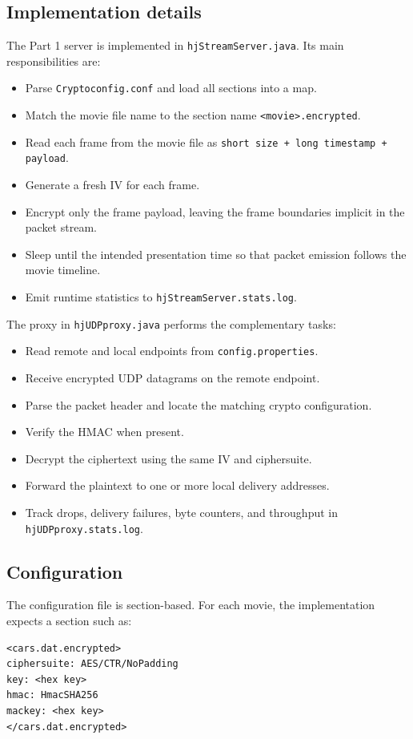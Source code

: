 \documentclass[11pt,a4paper]{article}
\begin{document}
\subsection{Implementation details}
The Part 1 server is implemented in \texttt{hjStreamServer.java}. Its main responsibilities are:
\begin{itemize}[leftmargin=1.2em]
  \item Parse \texttt{Cryptoconfig.conf} and load all sections into a map.
  \item Match the movie file name to the section name \texttt{<movie>.encrypted}.
  \item Read each frame from the movie file as \texttt{short size + long timestamp + payload}.
  \item Generate a fresh IV for each frame.
  \item Encrypt only the frame payload, leaving the frame boundaries implicit in the packet stream.
  \item Sleep until the intended presentation time so that packet emission follows the movie timeline.
  \item Emit runtime statistics to \texttt{hjStreamServer.stats.log}.
\end{itemize}

The proxy in \texttt{hjUDPproxy.java} performs the complementary tasks:
\begin{itemize}[leftmargin=1.2em]
  \item Read remote and local endpoints from \texttt{config.properties}.
  \item Receive encrypted UDP datagrams on the remote endpoint.
  \item Parse the packet header and locate the matching crypto configuration.
  \item Verify the HMAC when present.
  \item Decrypt the ciphertext using the same IV and ciphersuite.
  \item Forward the plaintext to one or more local delivery addresses.
  \item Track drops, delivery failures, byte counters, and throughput in \texttt{hjUDPproxy.stats.log}.
\end{itemize}

\subsection{Configuration}
The configuration file is section-based. For each movie, the implementation expects a section such as:
\begin{lstlisting}[language=plain]
<cars.dat.encrypted>
ciphersuite: AES/CTR/NoPadding
key: <hex key>
hmac: HmacSHA256
mackey: <hex key>
</cars.dat.encrypted>
\end{lstlisting}
\end{document}
